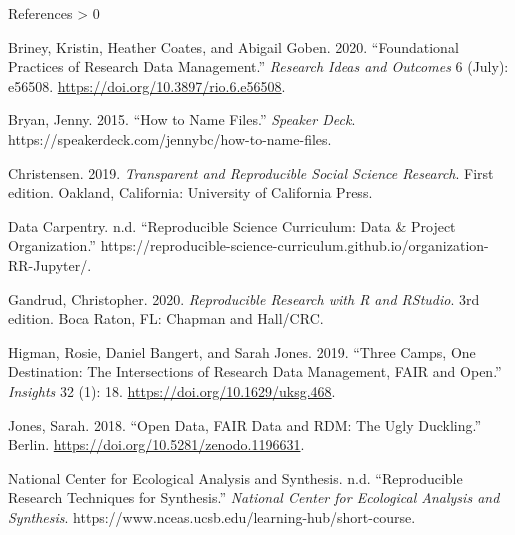 \documentclass[
  ignorenonframetext,
]{beamer}
\newlength{\cslhangindent}
\newenvironment{CSLReferences}[2] %
 {%
  \setlength{\parindent}{0pt}
  \ifodd #1 \everypar{\setlength{\hangindent}{\cslhangindent}}\ignorespaces\fi
  \ifnum #2 > 0
  \setlength{\parskip}{#2\baselineskip}
  \fi
 }%
 {}
\begin{document}
\begin{frame}{References}
\protect\hypertarget{references}{}
\hypertarget{refs}{}
\begin{CSLReferences}{1}{0}
\leavevmode\hypertarget{ref-briney_foundational_2020}{}%
Briney, Kristin, Heather Coates, and Abigail Goben. 2020.
{``Foundational {Practices} of {Research Data Management}.''}
\emph{Research Ideas and Outcomes} 6 (July): e56508.
\url{https://doi.org/10.3897/rio.6.e56508}.

\leavevmode\hypertarget{ref-bryan2015}{}%
Bryan, Jenny. 2015. {``How to Name Files.''} \emph{Speaker Deck}.
https://speakerdeck.com/jennybc/how-to-name-files.

\leavevmode\hypertarget{ref-christensen2019}{}%
Christensen. 2019. \emph{Transparent and {Reproducible Social Science
Research}}. First edition. {Oakland, California}: {University of
California Press}.

\leavevmode\hypertarget{ref-datacarpentry}{}%
Data Carpentry. n.d. {``Reproducible {Science Curriculum}: Data \&
{Project Organization}.''}
https://reproducible-science-curriculum.github.io/organization-RR-Jupyter/.

\leavevmode\hypertarget{ref-gandrud2020}{}%
Gandrud, Christopher. 2020. \emph{Reproducible {Research} with {R} and
{RStudio}}. 3rd edition. {Boca Raton, FL}: {Chapman and Hall/CRC}.

\leavevmode\hypertarget{ref-higman2019}{}%
Higman, Rosie, Daniel Bangert, and Sarah Jones. 2019. {``Three Camps,
One Destination: The Intersections of Research Data Management, {FAIR}
and {Open}.''} \emph{Insights} 32 (1): 18.
\url{https://doi.org/10.1629/uksg.468}.

\leavevmode\hypertarget{ref-jones_open_2018}{}%
Jones, Sarah. 2018. {``Open Data, {FAIR} Data and {RDM}: The Ugly
Duckling.''} {Berlin}. \url{https://doi.org/10.5281/zenodo.1196631}.

\leavevmode\hypertarget{ref-nationalcenterforecologicalanalysisandsynthesis}{}%
National Center for Ecological Analysis and Synthesis. n.d.
{``Reproducible {Research Techniques} for {Synthesis}.''} \emph{National
Center for Ecological Analysis and Synthesis}.
https://www.nceas.ucsb.edu/learning-hub/short-course.

\end{CSLReferences}
\end{frame}
\end{document}
